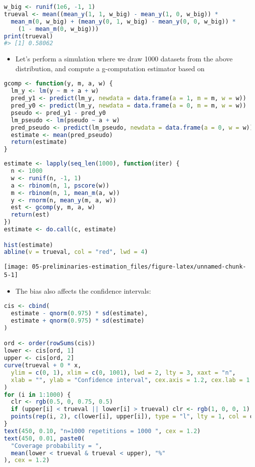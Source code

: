 \documentclass[
  12pt,
]{book}
\providecommand{\tightlist}{%
  \setlength{\itemsep}{0pt}\setlength{\parskip}{0pt}}
\theoremstyle{definition}
\theoremstyle{definition}
\theoremstyle{definition}
\newcommand{\1}{\mathbbm{1}}
\begin{document}
\begin{lstlisting}[language=R]
w_big <- runif(1e6, -1, 1)
trueval <- mean((mean_y(1, 1, w_big) - mean_y(1, 0, w_big)) *
  mean_m(0, w_big) + (mean_y(0, 1, w_big) - mean_y(0, 0, w_big)) *
    (1 - mean_m(0, w_big)))
print(trueval)
#> [1] 0.58062
\end{lstlisting}

\begin{itemize}
\tightlist
\item
  Let's perform a simulation where we draw 1000 datasets from the above
  distribution, and compute a g-computation estimator based on
\end{itemize}

\begin{lstlisting}[language=R]
gcomp <- function(y, m, a, w) {
  lm_y <- lm(y ~ m + a + w)
  pred_y1 <- predict(lm_y, newdata = data.frame(a = 1, m = m, w = w))
  pred_y0 <- predict(lm_y, newdata = data.frame(a = 0, m = m, w = w))
  pseudo <- pred_y1 - pred_y0
  lm_pseudo <- lm(pseudo ~ a + w)
  pred_pseudo <- predict(lm_pseudo, newdata = data.frame(a = 0, w = w))
  estimate <- mean(pred_pseudo)
  return(estimate)
}
\end{lstlisting}

\begin{lstlisting}[language=R]
estimate <- lapply(seq_len(1000), function(iter) {
  n <- 1000
  w <- runif(n, -1, 1)
  a <- rbinom(n, 1, pscore(w))
  m <- rbinom(n, 1, mean_m(a, w))
  y <- rnorm(n, mean_y(m, a, w))
  est <- gcomp(y, m, a, w)
  return(est)
})
estimate <- do.call(c, estimate)

hist(estimate)
abline(v = trueval, col = "red", lwd = 4)
\end{lstlisting}

\begin{center}\texttt{[image: 05-preliminaries-estimation\_files/figure-latex/unnamed-chunk-5-1]} \end{center}

\begin{itemize}
\tightlist
\item
  The bias also affects the confidence intervals:
\end{itemize}

\begin{lstlisting}[language=R]
cis <- cbind(
  estimate - qnorm(0.975) * sd(estimate),
  estimate + qnorm(0.975) * sd(estimate)
)

ord <- order(rowSums(cis))
lower <- cis[ord, 1]
upper <- cis[ord, 2]
curve(trueval + 0 * x,
  ylim = c(0, 1), xlim = c(0, 1001), lwd = 2, lty = 3, xaxt = "n",
  xlab = "", ylab = "Confidence interval", cex.axis = 1.2, cex.lab = 1.2
)
for (i in 1:1000) {
  clr <- rgb(0.5, 0, 0.75, 0.5)
  if (upper[i] < trueval || lower[i] > trueval) clr <- rgb(1, 0, 0, 1)
  points(rep(i, 2), c(lower[i], upper[i]), type = "l", lty = 1, col = clr)
}
text(450, 0.10, "n=1000 repetitions = 1000 ", cex = 1.2)
text(450, 0.01, paste0(
  "Coverage probability = ",
  mean(lower < trueval & trueval < upper), "%"
), cex = 1.2)
\end{lstlisting}
\end{document}
